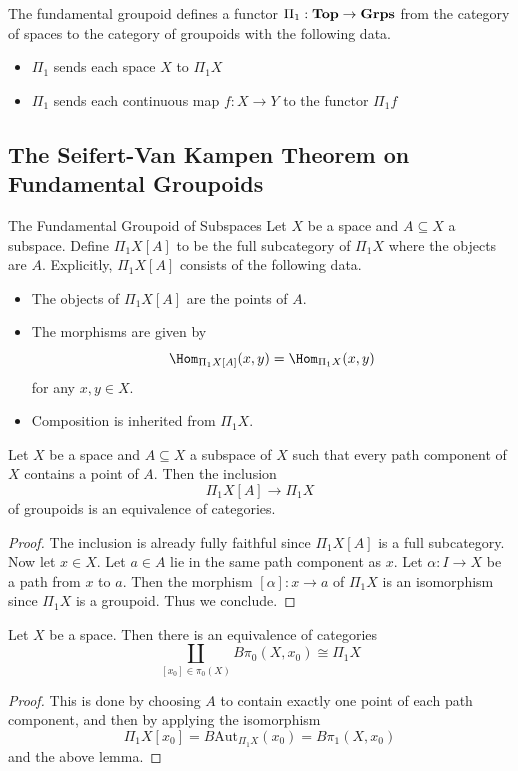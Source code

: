 \documentclass[a4paper]{article}
\begin{document}
\begin{thm}{}{} The fundamental groupoid defines a functor $\Pi_1:\bold{Top}\to\bold{Grps}$ from the category of spaces to the category of groupoids with the following data. 
\begin{itemize}
\item $\Pi_1$ sends each space $X$ to $\Pi_1X$
\item $\Pi_1$ sends each continuous map $f:X\to Y$ to the functor $\Pi_1f$
\end{itemize}
\end{thm}

\subsection{The Seifert-Van Kampen Theorem on Fundamental Groupoids}
\begin{defn}{The Fundamental Groupoid of Subspaces}{} Let $X$ be a space and $A\subseteq X$ a subspace. Define $\Pi_1X[A]$ to be the full subcategory of $\Pi_1X$ where the objects are $A$. Explicitly, $\Pi_1X[A]$ consists of the following data. 
\begin{itemize}
\item The objects of $\Pi_1X[A]$ are the points of $A$. 
\item The morphisms are given by $$\Hom_{\Pi_1X[A]}(x,y)=\Hom_{\Pi_1X}(x,y)$$ for any $x,y\in X$. 
\item Composition is inherited from $\Pi_1X$. 
\end{itemize}
\end{defn}

\begin{lmm}{}{} Let $X$ be a space and $A\subseteq X$ a subspace of $X$ such that every path component of $X$ contains a point of $A$. Then the inclusion $$\Pi_1X[A]\to\Pi_1X$$ of groupoids is an equivalence of categories. \tcbline
\begin{proof}
The inclusion is already fully faithful since $\Pi_1X[A]$ is a full subcategory. Now let $x\in X$. Let $a\in A$ lie in the same path component as $x$. Let $\alpha:I\to X$ be a path from $x$ to $a$. Then the morphism $[\alpha]:x\to a$ of $\Pi_1X$ is an isomorphism since $\Pi_1X$ is a groupoid. Thus we conclude. 
\end{proof}
\end{lmm}

\begin{crl}{}{} Let $X$ be a space. Then there is an equivalence of categories $$\coprod_{[x_0]\in\pi_0(X)}B\pi_0(X,x_0)\cong\Pi_1X$$ \tcbline
\begin{proof}
This is done by choosing $A$ to contain exactly one point of each path component, and then by applying the isomorphism $$\Pi_1X[x_0]=B\text{Aut}_{\Pi_1X}(x_0)=B\pi_1(X,x_0)$$ and the above lemma. 
\end{proof}
\end{crl}
\end{document}
